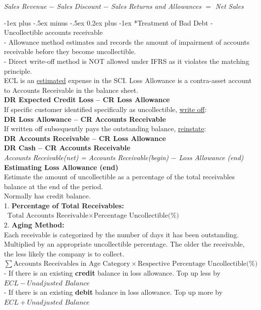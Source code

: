 \documentclass[10pt,landscape]{article}
\makeatletter
\renewcommand{\subsubsection}{\@startsection{subsubsection}{3}{0mm}%
                                {-1ex plus -.5ex minus -.5ex}%
                                {0.2ex plus -1ex}%
                                {\normalfont\footnotesize\bfseries}}
\makeatother
\begin{document}
\begin{multicols}{3}
\begin{scriptsize}
\textit{Sales Revenue $-$ Sales Discount $-$ Sales Returns and Allowances $=$ Net Sales}

\subsubsection*{Treatment of Bad Debt}
- Uncollectible accounts receivable\\
- Allowance method estimates and records the amount of 
impairment of accounts receivable before they become 
uncollectible.\\
-  Direct write-off method is NOT allowed under IFRS as 
it violates the matching principle.\\
ECL is an \underline{estimated} expense in the SCI. Loss Allowance is a contra-asset account to Accounts Receivable in the balance sheet.\\
\textbf{DR Expected Credit Loss -- CR Loss Allowance}\\
If specific customer identified specifically as uncollectible, \underline{write off}:\\
\textbf{DR Loss Allowance -- CR Accounts Receivable}\\
If written off subsequently pays the outstanding balance, \underline{reinstate}:\\
\textbf{DR Accounts Receivable -- CR Loss Allowance}\\
\textbf{DR Cash -- CR Accounts Receivable}\\

\textit{Accounts Receivable(net) = Accounts Receivable(begin) $-$ Loss Allowance (end)}\\

\textbf{Estimating Loss Allowance (end)}\\
Estimate the amount of uncollectible as a percentage of 
the total receivables balance at the end of the period.\\
Normally has credit balance.\\
1. \textbf{Percentage of Total Receivables:}\\
$\text{ Total Accounts Receivable} \times \text{Percentage Uncollectible(\%)}$\\
2. \textbf{Aging Method:}\\
Each receivable is categorized by the number of days it has 
been outstanding.\\
Multiplied by an appropriate 
uncollectible percentage. The older the 
receivable, the less likely the company is to collect.\\
$\sum \text{Accounts Receivables in Age Category} \times \text{Respective Percentage Uncollectible(\%)}$\\
- If there is an existing \textbf{credit} balance in loss allowance. Top up less by $ECL - \textit{Unadjusted Balance}$\\
- If there is an existing \textbf{debit} balance in loss allowance. Top up more by $ECL + \textit{Unadjusted Balance}$\\



\end{scriptsize}
\end{multicols}
\end{document}
